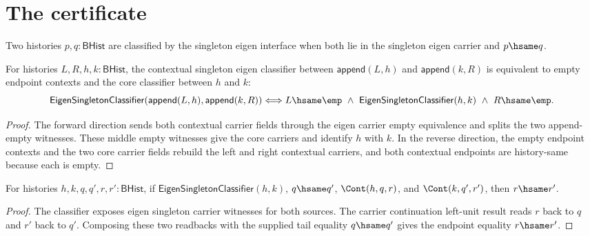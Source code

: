 \section{The certificate}
\label{sec:eigen-certificate}

\begin{definition}
\label{def:eigen-singleton-classifier}
Two histories $p,q:\mathsf{BHist}$ are classified by the singleton eigen
interface when both lie in the singleton eigen carrier and $p\hsame q$.
\end{definition}

\begin{theorem}
\label{thm:eigen-singleton-classifier-append-context-empty-iff}
For histories $L,R,h,k:\mathsf{BHist}$, the contextual singleton eigen
classifier between $\mathsf{append}(L,h)$ and $\mathsf{append}(k,R)$ is
equivalent to empty endpoint contexts and the core classifier between $h$ and
$k$:
$$
\mathsf{EigenSingletonClassifier}(\mathsf{append}(L,h),\mathsf{append}(k,R))
\Longleftrightarrow
L\hsame\emp\ \wedge\ \mathsf{EigenSingletonClassifier}(h,k)\ \wedge\ R\hsame\emp.
$$
\end{theorem}
\begin{proof}
The forward direction sends both contextual carrier fields through the eigen
carrier empty equivalence and splits the two append-empty witnesses. These
middle empty witnesses give the core carriers and identify $h$ with $k$. In the
reverse direction, the empty endpoint contexts and the two core carrier fields
rebuild the left and right contextual carriers, and both contextual endpoints
are history-same because each is empty.
\end{proof}

\begin{theorem}
\label{thm:eigen-singleton-classifier-continuation-results-hsame}
For histories $h,k,q,q',r,r':\mathsf{BHist}$, if
$\mathsf{EigenSingletonClassifier}(h,k)$, $q\hsame q'$,
$\Cont(h,q,r)$, and $\Cont(k,q',r')$, then $r\hsame r'$.
\end{theorem}
\begin{proof}
The classifier exposes eigen singleton carrier witnesses for both sources.
The carrier continuation left-unit result reads $r$ back to $q$ and $r'$ back
to $q'$. Composing these two readbacks with the supplied tail equality
$q\hsame q'$ gives the endpoint equality $r\hsame r'$.
\end{proof}

